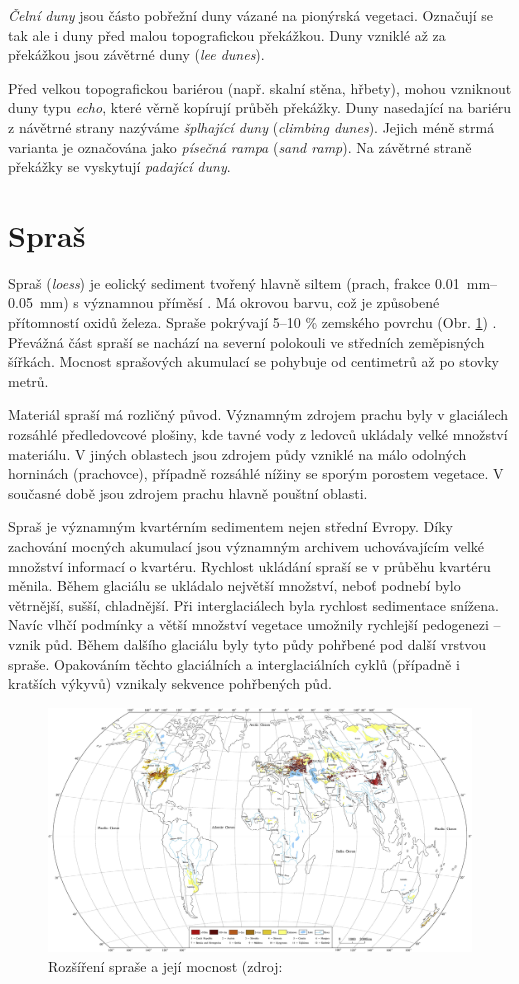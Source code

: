 \emph{Čelní duny} jsou částo pobřežní duny vázané na pionýrská vegetaci. Označují se tak ale i duny před malou topografickou překážkou. Duny vzniklé až za překážkou jsou závětrné duny (\textit{lee dunes}).

Před velkou topografickou bariérou (např. skalní stěna, hřbety),  mohou vzniknout duny typu \emph{echo}, které věrně kopírují průběh překážky. Duny nasedající na bariéru z návětrné strany nazýváme \emph{šplhající duny} (\textit{climbing dunes}). Jejich méně strmá varianta je označována jako \emph{písečná rampa} (\textit{sand ramp}). Na závětrné straně překážky se vyskytují \emph{padající duny}.

\section{Spraš}
Spraš (\textit{loess}) je eolický sediment tvořený hlavně siltem (prach, frakce \SIrange{0,01}{0,05}{\milli\metre}) s významnou příměsí . Má okrovou barvu, což je způsobené přítomností oxidů železa. Spraše pokrývají 5--10 \% zemského povrchu (Obr. \ref{fig:spras_distribuce}) \textcite{biermanKeyConceptsGeomorphology2014}. Převážná část spraší se nachází na severní polokouli ve středních zeměpisných šířkách. Mocnost sprašových akumulací se pohybuje od centimetrů až po stovky metrů. 

Materiál spraší má rozličný původ. Významným zdrojem prachu byly v glaciálech rozsáhlé předledovcové plošiny, kde tavné vody z ledovců ukládaly velké množství materiálu. V jiných oblastech jsou zdrojem půdy vzniklé na málo odolných horninách (prachovce), případně rozsáhlé nížiny se sporým porostem vegetace. V současné době jsou zdrojem prachu hlavně pouštní oblasti.

Spraš je významným kvartérním sedimentem nejen střední Evropy. Díky zachování mocných akumulací jsou významným archivem uchovávajícím velké množství informací o kvartéru. Rychlost ukládání spraší se v průběhu kvartéru měnila. Během glaciálu se ukládalo největší množství, neboť podnebí bylo větrnější, sušší, chladnější. Při interglaciálech byla rychlost sedimentace snížena. Navíc vlhčí podmínky a větší množství vegetace umožnily rychlejší pedogenezi -- vznik půd. Během dalšího glaciálu byly tyto půdy pohřbené pod další vrstvou spraše. Opakováním těchto glaciálních a interglaciálních cyklů (případně i kratších výkyvů) vznikaly sekvence pohřbených půd. 

\begin{landscape}
	\begin{figure}
		\centering
		\includegraphics[width=1\linewidth]{obrazky/eolicka/loes_distr}
		\caption{Rozšíření spraše a její mocnost (zdroj: \textcite{liLoessGenesisWorldwide2020}}
		\label{fig:spras_distribuce}
	\end{figure}
\end{landscape}